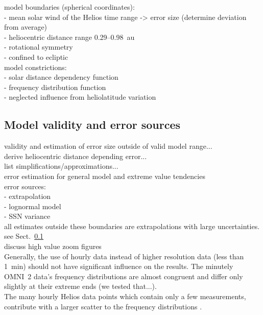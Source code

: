 model boundaries (spherical coordinates):\\
- mean solar wind of the Helios time range -> error size (determine deviation from average)\\
- heliocentric distance range 0.29--0.98~au\\
- rotational symmetry\\
- confined to ecliptic\\
model constrictions:\\
- solar distance dependency function\\
- frequency distribution function\\
- neglected influence from heliolatitude variation\\


\subsection{Model validity and error sources}
\label{sec:model_validity_and_errors}

validity and estimation of error size outside of valid model range...\\
derive heliocentric distance depending error...\\

list simplifications/approximations...\\

error estimation for general model and extreme value tendencies\\

error sources:\\
- extrapolation\\
- lognormal model\\
- SSN variance\\

all estimates outside these boundaries are extrapolations with large uncertainties. see Sect.~\ref{sec:model_validity_and_errors}\\

discuss high value zoom figures\\

Generally, the use of hourly data instead of higher resolution data (less than 1~min) should not have significant influence on the results. The minutely OMNI~2 data's frequency distributions are almost congruent and differ only slightly at their extreme ends (we tested that...).\\

The many hourly Helios data points which contain only a few measurements, contribute with a larger scatter to the frequency distributions \citep[p.~491]{Schwenn1983}.\\

